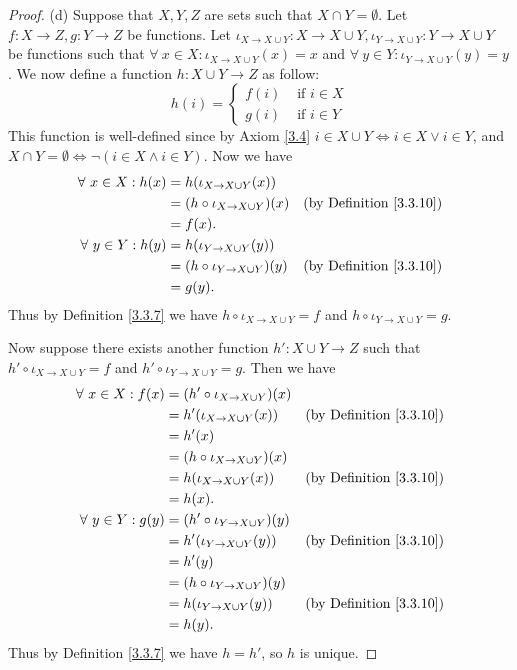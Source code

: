 \begin{proof}{(d)}
Suppose that \(X, Y, Z\) are sets such that \(X \cap Y = \emptyset\).
Let \(f : X \to Z, g : Y \to Z\) be functions.
Let \(\iota_{X \to X \cup Y} : X \to X \cup Y, \iota_{Y \to X \cup Y} : Y \to X \cup Y\) be functions such that \(\forall\ x \in X : \iota_{X \to X \cup Y}(x) = x\) and \(\forall\ y \in Y : \iota_{Y \to X \cup Y}(y) = y\).
We now define a function \(h : X \cup Y \to Z\) as follow:
\[
    h(i) = \begin{cases}
    f(i) & \text{ if } i \in X \\
    g(i) & \text{ if } i \in Y
    \end{cases}
\]
This function is well-defined since by Axiom \ref{3.4} \(i \in X \cup Y \iff i \in X \lor i \in Y\), and \(X \cap Y = \emptyset \iff \lnot(i \in X \land i \in Y)\).
Now we have
\begin{align*}
\forall\ x \in X : h(x) &= h(\iota_{X \to X \cup Y}(x)) \\
&= (h \circ \iota_{X \to X \cup Y})(x) & \text{(by Definition \ref{3.3.10})} \\
&= f(x). \\
\forall\ y \in Y : h(y) &= h(\iota_{Y \to X \cup Y}(y)) \\
&= (h \circ \iota_{Y \to X \cup Y})(y) & \text{(by Definition \ref{3.3.10})} \\
&= g(y).
\end{align*}
Thus by Definition \ref{3.3.7} we have \(h \circ \iota_{X \to X \cup Y} = f\) and \(h \circ \iota_{Y \to X \cup Y} = g\).

Now suppose there exists another function \(h' : X \cup Y \to Z\) such that \(h' \circ \iota_{X \to X \cup Y} = f\) and \(h' \circ \iota_{Y \to X \cup Y} = g\).
Then we have
\begin{align*}
\forall\ x \in X : f(x) &= (h' \circ \iota_{X \to X \cup Y})(x) \\
&= h'(\iota_{X \to X \cup Y}(x)) & \text{(by Definition \ref{3.3.10})} \\
&= h'(x) \\
&= (h \circ \iota_{X \to X \cup Y})(x) \\
&= h(\iota_{X \to X \cup Y}(x)) & \text{(by Definition \ref{3.3.10})} \\
&= h(x). \\
\forall\ y \in Y : g(y) &= (h' \circ \iota_{Y \to X \cup Y})(y) \\
&= h'(\iota_{Y \to X \cup Y}(y)) & \text{(by Definition \ref{3.3.10})} \\
&= h'(y) \\
&= (h \circ \iota_{Y \to X \cup Y})(y) \\
&= h(\iota_{Y \to X \cup Y}(y)) & \text{(by Definition \ref{3.3.10})} \\
&= h(y).
\end{align*}
Thus by Definition \ref{3.3.7} we have \(h = h'\), so \(h\) is unique.
\end{proof}